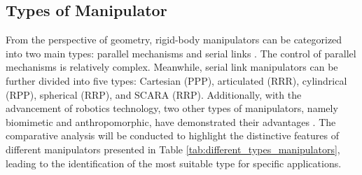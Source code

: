\subsection{Types of Manipulator }
From the perspective of geometry, rigid-body manipulators can be categorized into two main types: parallel 
mechanisms and serial links \cite{MECH0089book}. The control of parallel mechanisms is relatively complex. 
Meanwhile, serial link manipulators can be further divided into five types: Cartesian (PPP), articulated (RRR), 
cylindrical (RPP), spherical (RRP), and SCARA (RRP). Additionally, with the advancement of robotics technology, 
two other types of manipulators, namely biomimetic and anthropomorphic, have demonstrated their advantages 
\cite{manipulators_types1,manipulators_types2}.
The comparative analysis will be conducted to highlight the distinctive features of different manipulators 
presented in Table \ref{tab:different_types_manipulators}, leading to the identification of the most suitable 
type for specific applications.
